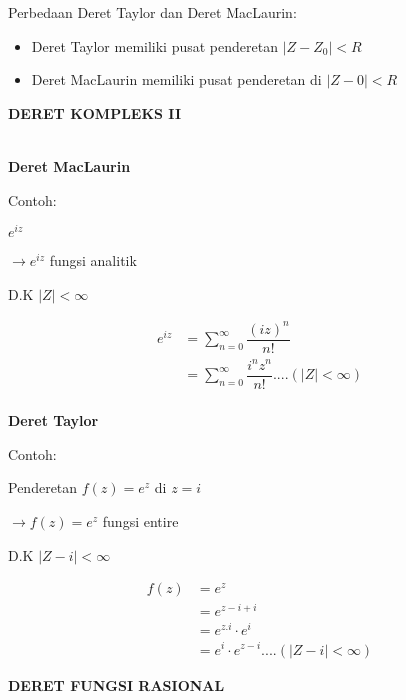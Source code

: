 \documentclass{article}
\begin{document}
Perbedaan Deret Taylor dan Deret MacLaurin:
\begin{itemize}
    \item Deret Taylor memiliki pusat penderetan $|Z-Z_0|<R$
    \item Deret MacLaurin memiliki pusat penderetan di $|Z-0|<R$
\end{itemize}



\newpage
\begin{center}
    \textbf{DERET KOMPLEKS II}
\end{center}
\leavevmode\\

\textbf{Deret MacLaurin}

Contoh:

$e^{iz}$

$\rightarrow e^{iz}$ fungsi analitik

D.K $|Z|<\infty$

\begin{align}
    e^{iz} & = \sum_{n=0}^{\infty} \dfrac{(iz)^n}{n!}
    \nonumber                                                             \\
           & = \sum_{n=0}^{\infty} \dfrac{i^n z^n}{n!} .... (|Z|< \infty)
    \nonumber
\end{align}
\leavevmode\\

\textbf{Deret Taylor}

Contoh:

Penderetan $f(z) = e^z$ di $z = i$

$\rightarrow f(z) = e^z$ fungsi entire

D.K $|Z-i|<\infty$

\begin{align}
    f(z) & = e^z
    \nonumber                                       \\
         & = e^{z-i+i}
    \nonumber                                       \\
         & = e^{z.i} \cdot e^i
    \nonumber                                       \\
         & = e^i \cdot e^{z-i} .... (|Z-i|< \infty)
    \nonumber
\end{align}



\newpage
\begin{center}
    \textbf{DERET FUNGSI RASIONAL}
\end{center}
\leavevmode\\
\end{document}
